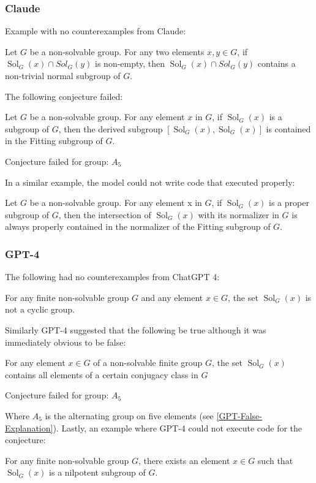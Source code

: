 \documentclass{article}
\begin{document}
\subsubsection{Claude}
Example with no counterexamples from Claude: 
\begin{conj}
    Let $G$ be a non-solvable group. For any two elements $x, y \in G$, if $\operatorname{Sol}_G(x) \cap Sol_G(y)$ is non-empty, then $\operatorname{Sol}_G(x) \cap Sol_G(y)$ contains a non-trivial normal subgroup of $G$.
\end{conj}
The following conjecture failed:
\begin{conj}\label{Claude-False}
    Let $G$ be a non-solvable group. For any element $x$ in $G$, if $\operatorname{Sol}_G(x)$ is a subgroup of $G$, then the derived subgroup $[\operatorname{Sol}_G(x), \operatorname{Sol}_G(x)]$ is contained in the Fitting subgroup of $G$.
\end{conj}
\begin{codeout}
    Conjecture failed for group: $A_5$
\end{codeout}
In a similar example, the model could not write code that executed properly:
\begin{conj}\label{claude-fitting}
    Let \(G\) be a non-solvable group. For any element x in \(G\), if \(\operatorname{Sol}_G(x)\) is a proper subgroup of \(G\), then the intersection of \(\operatorname{Sol}_G(x)\) with its normalizer in \(G\) is always properly contained in the normalizer of the Fitting subgroup of \(G\).
\end{conj}
\subsubsection{GPT-4}
The following had no counterexamples from ChatGPT 4:
\begin{conj}
    For any finite non-solvable group \( G \) and any element \( x \in G \), the set \( \operatorname{Sol}_G(x) \) is not a cyclic group.
    \label{conj:example1}
\end{conj}

Similarly GPT-4 suggested that the following be true although it was immediately obvious to be false: 
\begin{conj}\label{GPT-False}
    For any element \( x \in G \) of a non-solvable finite group \( G \), the set \( \operatorname{Sol}_G(x) \) contains all elements of a certain conjugacy class in \( G \)
\end{conj}
\begin{codeout}
    Conjecture failed for group: \(A_5\)
\end{codeout}
Where \(A_5\) is the alternating group on five elements (see \ref{GPT-False-Explanation}). Lastly, an example where GPT-4 could not execute code for the conjecture:
\begin{conj}
    For any finite non-solvable group \( G \), there exists an element \( x \in G \) such that \( \operatorname{Sol}_G(x) \) is a nilpotent subgroup of \( G \).
\end{conj}
\end{document}
